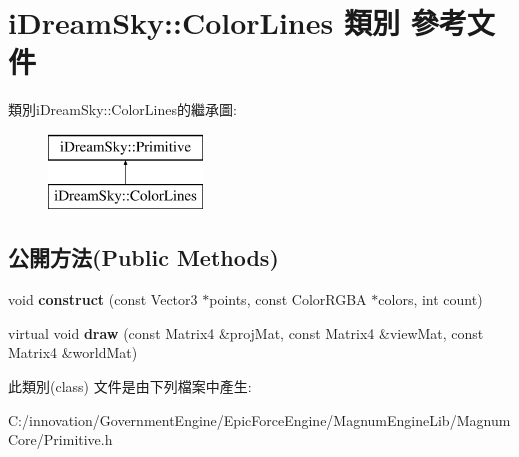 \hypertarget{classi_dream_sky_1_1_color_lines}{}\section{i\+Dream\+Sky\+:\+:Color\+Lines 類別 參考文件}
\label{classi_dream_sky_1_1_color_lines}
類別i\+Dream\+Sky\+:\+:Color\+Lines的繼承圖\+:\begin{figure}[H]
\begin{center}
\leavevmode
\includegraphics[height=2.000000cm]{classi_dream_sky_1_1_color_lines}
\end{center}
\end{figure}
\subsection*{公開方法(Public Methods)}
\begin{DoxyCompactItemize}
\item 
void {\bfseries construct} (const Vector3 $\ast$points, const Color\+R\+G\+BA $\ast$colors, int count)\hypertarget{classi_dream_sky_1_1_color_lines_a80da7eda87e7ca2414085f6937086ab5}{}\label{classi_dream_sky_1_1_color_lines_a80da7eda87e7ca2414085f6937086ab5}

\item 
virtual void {\bfseries draw} (const Matrix4 \&proj\+Mat, const Matrix4 \&view\+Mat, const Matrix4 \&world\+Mat)\hypertarget{classi_dream_sky_1_1_color_lines_a82305e0e9157f9ea32621bf857b7f85c}{}\label{classi_dream_sky_1_1_color_lines_a82305e0e9157f9ea32621bf857b7f85c}

\end{DoxyCompactItemize}


此類別(class) 文件是由下列檔案中產生\+:\begin{DoxyCompactItemize}
\item 
C\+:/innovation/\+Government\+Engine/\+Epic\+Force\+Engine/\+Magnum\+Engine\+Lib/\+Magnum\+Core/Primitive.\+h\end{DoxyCompactItemize}
